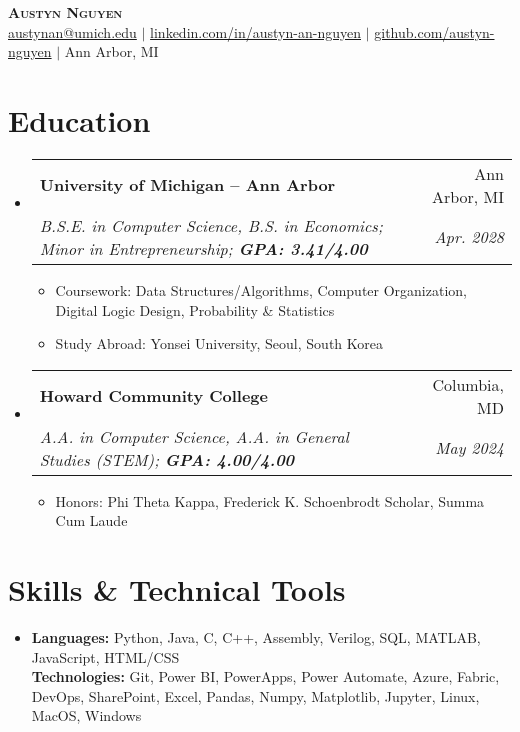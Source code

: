 \documentclass[letterpaper,11pt]{article}
\makeatletter
\newcommand{\resumeItem}[1]{\item[\textopenbullet]\small{#1 \vspace{-2pt}}}
\newcommand{\resumeSubheading}[4]{
  \vspace{-2pt}\item
  \begin{tabular*}{0.97\textwidth}[t]{l@{\extracolsep{\fill}}r}
    \textbf{#1} & #2 \\
    \textit{\small#3} & \textit{\small #4} \\
  \end{tabular*}\vspace{-7pt}
}
\newcommand{\resumeSubHeadingListStart}{\begin{itemize}[leftmargin=0.15in, label={}]}
\newcommand{\resumeSubHeadingListEnd}{\end{itemize}}
\newcommand{\resumeItemListStart}{\begin{itemize}[leftmargin=0.2in, label=\textopenbullet]}
\newcommand{\resumeItemListEnd}{\end{itemize}\vspace{-5pt}}
\makeatother
\begin{document}
\begin{center}
  \textbf{\Huge \scshape Austyn Nguyen} \\ \vspace{3pt}
  \small
  \faEnvelope \hspace{.5pt} \href{mailto:austynan@umich.edu}{austynan@umich.edu}
  $|$
  \faLinkedinSquare \hspace{.5pt} \href{https://www.linkedin.com/in/austyn-an-nguyen}{linkedin.com/in/austyn-an-nguyen}
  $|$
  \faGithub \hspace{.5pt} \href{https://github.com/austyn-nguyen}{github.com/austyn-nguyen}
  $|$
  \faMapMarker \hspace{.5pt} Ann Arbor, MI
\end{center}

\section{Education}
\resumeSubHeadingListStart
  \resumeSubheading
    {University of Michigan -- Ann Arbor}{Ann Arbor, MI}
  {B.S.E. in Computer Science, B.S. in Economics; Minor in Entrepreneurship; \textbf{GPA: 3.41/4.00}}{Apr. 2028}
  \resumeItemListStart
    \resumeItem{Coursework: Data Structures/Algorithms, Computer Organization, Digital Logic Design, Probability \& Statistics}
    \resumeItem{Study Abroad: Yonsei University, Seoul, South Korea}
\resumeItemListEnd

  \resumeSubheading
    {Howard Community College}{Columbia, MD}
    {A.A. in Computer Science, A.A. in General Studies (STEM); \textbf{GPA: 4.00/4.00}}{May 2024}
    \resumeItemListStart
        \resumeItem{Honors: Phi Theta Kappa, Frederick K. Schoenbrodt Scholar, Summa Cum Laude}
    \resumeItemListEnd
\resumeSubHeadingListEnd

\section{Skills \& Technical Tools}
\resumeSubHeadingListStart
  \item{
    \textbf{Languages:} Python, Java, C, C++, Assembly, Verilog, SQL, MATLAB, JavaScript, HTML/CSS \\
    \textbf{Technologies:} Git, Power BI, PowerApps, Power Automate, Azure, Fabric, DevOps, SharePoint, Excel, Pandas, Numpy, Matplotlib, Jupyter, Linux, MacOS, Windows
  }
\resumeSubHeadingListEnd
\end{document}
